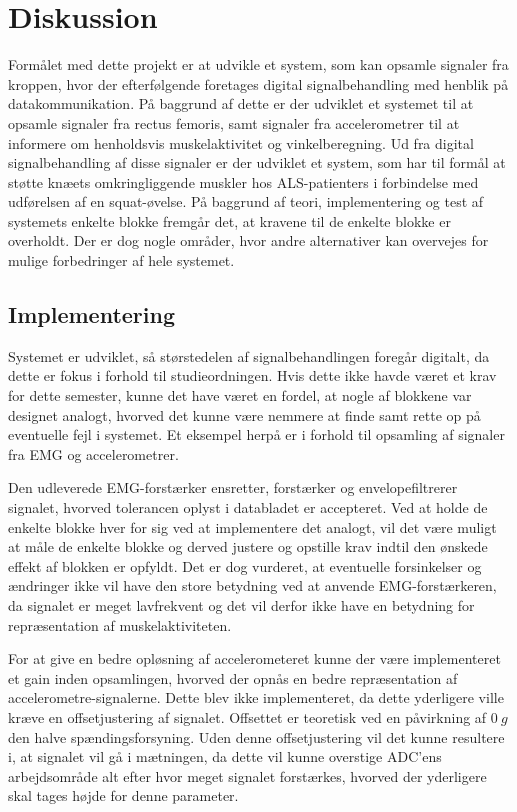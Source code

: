 \section{Diskussion}
Formålet med dette projekt er at udvikle et system, som kan opsamle signaler fra kroppen, hvor der efterfølgende foretages digital signalbehandling med henblik på datakommunikation. På baggrund af dette er der udviklet et systemet til at opsamle signaler fra rectus femoris, samt signaler fra accelerometrer til at informere om henholdsvis muskelaktivitet og vinkelberegning. Ud fra digital signalbehandling af disse signaler er der udviklet et system, som har til formål at støtte knæets omkringliggende muskler hos ALS-patienters i forbindelse med udførelsen af en squat-øvelse. På baggrund af teori, implementering og test af systemets enkelte blokke fremgår det, at kravene til de enkelte blokke er overholdt. Der er dog nogle områder, hvor andre alternativer kan overvejes for mulige forbedringer af hele systemet. 

\subsection{Implementering}
Systemet er udviklet, så størstedelen af signalbehandlingen foregår digitalt, da dette er fokus i forhold til studieordningen. Hvis dette ikke havde været et krav for dette semester, kunne det have været en fordel, at nogle af blokkene var designet analogt, hvorved det kunne være nemmere at finde samt rette op på eventuelle fejl i systemet. Et eksempel herpå er i forhold til opsamling af signaler fra EMG og accelerometrer. 

Den udleverede EMG-forstærker ensretter, forstærker og envelopefiltrerer signalet, hvorved tolerancen oplyst i databladet er accepteret. Ved at holde de enkelte blokke hver for sig ved at implementere det analogt, vil det være muligt at måle de enkelte blokke og derved justere og opstille krav indtil den ønskede effekt af blokken er opfyldt. Det er dog vurderet, at eventuelle forsinkelser og ændringer ikke vil have den store betydning ved at anvende EMG-forstærkeren, da signalet er meget lavfrekvent og det vil derfor ikke have en betydning for repræsentation af muskelaktiviteten. 

For at give en bedre opløsning af accelerometeret kunne der være implementeret et gain inden opsamlingen, hvorved der opnås en bedre repræsentation af accelerometre-signalerne. Dette blev ikke implementeret, da dette yderligere ville kræve en offsetjustering af signalet. Offsettet er teoretisk ved en påvirkning af $0~g$ den halve spændingsforsyning. Uden denne offsetjustering vil det kunne resultere i, at signalet vil gå i mætningen, da dette vil kunne overstige ADC'ens arbejdsområde alt efter hvor meget signalet forstærkes, hvorved der yderligere skal tages højde for denne parameter.

